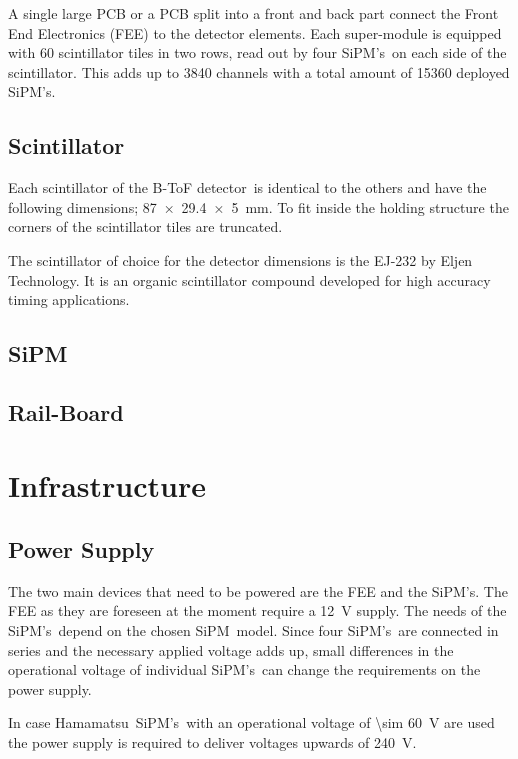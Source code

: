 \documentclass[12pt,a4paper,oneside]{article}
\newcommand{\btofD}{B-ToF detector}
\newcommand{\railboard}{Rail-Board}
\newcommand{\hamamatsu}{Hamamatsu}
\newcommand{\sipm}{SiPM}
\newcommand{\sipms}{SiPM's}
\begin{document}
A single large PCB or a PCB split into a front and back part connect the Front End Electronics (FEE) to the detector elements. 
Each super-module is equipped with 60 scintillator tiles in two rows, read out by four \sipms\ on each side of the scintillator. 
This adds up to 3840 channels with a total amount of \num{15360} deployed \sipms .

\subsection{Scintillator}
Each scintillator of the \btofD\ is identical to the others and have the following dimensions; \SI{87 x 29.4 x 5}{mm}.
To fit inside the holding structure the corners of the scintillator tiles are truncated.

The scintillator of choice for the detector dimensions is the EJ-232 by Eljen Technology. It is an organic scintillator compound developed for high accuracy timing applications. 

\subsection{\sipm}

\subsection{\railboard}


\section{Infrastructure}

\subsection{Power Supply}

The two main devices that need to be powered are the FEE and the \sipms .
The FEE as they are foreseen at the moment require a \SI{12}{V} supply.
The needs of the \sipms\ depend on the chosen \sipm\ model. Since four \sipms\ are connected in series and the necessary applied voltage adds up, small differences in the operational voltage of individual \sipms\ can change the requirements on the power supply.

In case \hamamatsu\ \sipms\ with an operational voltage of \SI{\sim 60}{V} are used the power supply is required to deliver voltages upwards of \SI{240}{V}.
\end{document}
